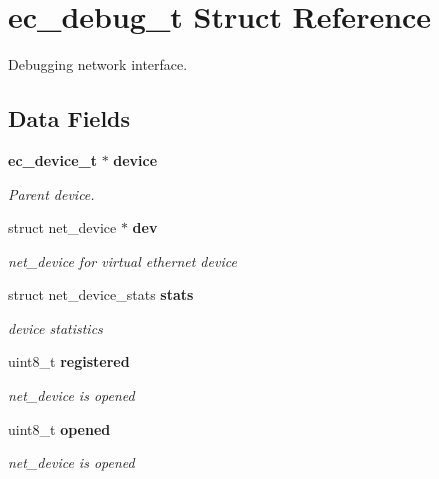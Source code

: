 \section{ec\-\_\-debug\-\_\-t Struct Reference}
\label{structec__debug__t}


Debugging network interface.  


\subsection*{Data Fields}
\begin{DoxyCompactItemize}
\item 
{\bf ec\-\_\-device\-\_\-t} $\ast$ {\bf device}
\begin{DoxyCompactList}\small\item\em Parent device. \end{DoxyCompactList}\item 
struct net\-\_\-device $\ast$ {\bf dev}\label{structec__debug__t_a9c741cbedd076599ac719146bb3bdc7d}

\begin{DoxyCompactList}\small\item\em net\-\_\-device for virtual ethernet device \end{DoxyCompactList}\item 
struct net\-\_\-device\-\_\-stats {\bf stats}\label{structec__debug__t_af6b70564444854f7f362fe5902e9dc34}

\begin{DoxyCompactList}\small\item\em device statistics \end{DoxyCompactList}\item 
uint8\-\_\-t {\bf registered}\label{structec__debug__t_afcecd6a1efb040b7b9740d6c0c48f497}

\begin{DoxyCompactList}\small\item\em net\-\_\-device is opened \end{DoxyCompactList}\item 
uint8\-\_\-t {\bf opened}\label{structec__debug__t_ac4b768dfed6808c7c0ced1de2a22aba1}

\begin{DoxyCompactList}\small\item\em net\-\_\-device is opened \end{DoxyCompactList}\end{DoxyCompactItemize}


